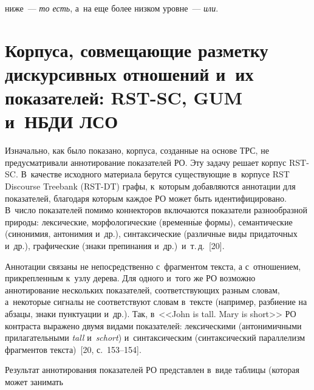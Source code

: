 \begin{multicols}{2}


\noindent
  ниже~--- \textit{то есть}, а~на еще более 
низ\-ком уровне~--- \textit{или}.
 


\section{Корпуса, совмещающие разметку дискурсивных отношений 
и~их показателей: RST-SC, GUM и~НБДИ ЛСО}

\vspace*{-2pt}

    Изначально, как было показано, корпуса, созданные на основе ТРС, не 
предусматривали аннотирование показателей РО. Эту задачу решает корпус RST-SC. В~качестве исходного материала \mbox{берутся} 
существующие в~корпусе RST Discourse Treebank (RST-DT) графы, к~которым 
добавляются аннотации для показателей, благодаря которым каждое РО может 
быть идентифицировано. В~чис\-ло показателей помимо коннекторов включаются 
показатели разнообразной природы: лексические, морфологические (временн$\acute{\mbox{ы}}$е 
формы), семантические (синонимия, антонимия и~др.), синтаксические 
(различные виды придаточных и~др.), графические (знаки препинания и~др.)\ 
и~т.\,д.~[20]. 

    Аннотации связаны не непосредственно с~фрагментом текста, а с~отношением, 
прикрепленным к~узлу дерева. Для одного и~того же РО возможно аннотирование 
нескольких показателей, соответствующих разным словам, а~некоторые сигналы 
не соответствуют словам в~текс\-те (например, раз\-биение на абзацы, знаки 
пунктуации и~др.). Так, в~<<John is tall. Mary is short>> РО контраста выражено 
двумя видами показателей: лексическими (антонимичными прилагательными 
\textit{tall} и~\textit{schort}) и~синтаксическим (синтаксический параллелизм 
фрагментов текста)~[20, с.~153--154]. 

Результат аннотирования показателей РО 
представлен в~виде таб\-ли\-цы (которая может занимать\linebreak\vspace*{-12pt}




{ \begin{center}  %
 \vspace*{-3pt}
   \mbox{%
\epsfxsize=64.133mm
}

\end{center}

}
\end{multicols}
